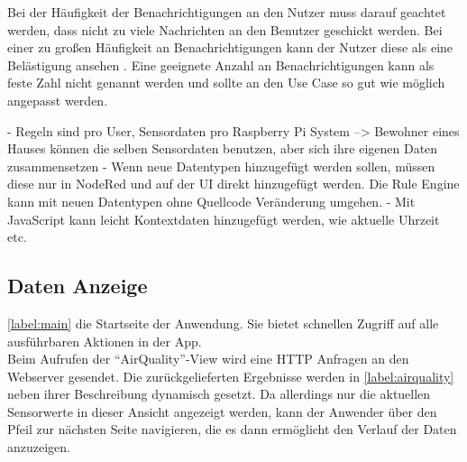 Bei der Häufigkeit der Benachrichtigungen an den Nutzer muss darauf geachtet werden, dass nicht zu viele Nachrichten an den Benutzer geschickt werden. Bei einer zu großen Häufigkeit an Benachrichtigungen kann der Nutzer diese als eine Belästigung ansehen \cite{gadgets:amountnotifications}. Eine geeignete Anzahl an Benachrichtigungen kann als feste Zahl nicht genannt werden und sollte an den Use Case so gut wie möglich angepasst werden.   


- Regeln sind pro User, Sensordaten pro Raspberry Pi System --> Bewohner eines Hauses können die selben Sensordaten benutzen, aber sich ihre eigenen Daten zusammensetzen
- Wenn neue Datentypen hinzugefügt werden sollen, müssen diese nur in NodeRed und auf der UI direkt hinzugefügt werden. Die Rule Engine kann mit neuen Datentypen ohne Quellcode Veränderung umgehen.
- Mit JavaScript kann leicht Kontextdaten hinzugefügt werden, wie aktuelle Uhrzeit etc.



\subsection{Daten Anzeige}
\autoref{label:main} die Startseite der Anwendung. Sie bietet schnellen Zugriff auf alle ausführbaren Aktionen in der App.
\\Beim Aufrufen der \enquote{AirQuality}-View wird eine \ac{HTTP} Anfragen an den Webserver gesendet. Die zurückgelieferten Ergebnisse werden in \autoref{label:airquality} neben ihrer Beschreibung dynamisch gesetzt. Da allerdings nur die aktuellen Sensorwerte in dieser Ansicht angezeigt werden, kann der Anwender über den Pfeil zur nächsten Seite navigieren, die es dann ermöglicht den Verlauf der Daten anzuzeigen. 

